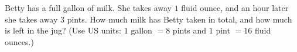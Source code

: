 Betty has a full gallon of milk. She takes away $1$ fluid ounce, and an hour later she takes away $3$ pints. How much milk has Betty taken in total, and how much is left in the jug? (Use US units: $1$ gallon $=8$ pints and $1$ pint $=16$ fluid ounces.)
